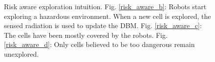 \label{annexe: intuition}
\begin{figure}[h]
    \centering
    \hfill
    \hfill
        \caption{Risk aware exploration intuition. Fig. \ref{risk_aware_b}: Robots start exploring a hazardous environment. When a new cell is explored, the sensed radiation is used to update the DBM. Fig. \ref{risk_aware_c}: The cells have been mostly covered by the robots. Fig. \ref{risk_aware_d}: Only cells believed to be too dangerous remain unexplored.}
    \label{risk_aware}
\end{figure}

\label{annexe: argos}

